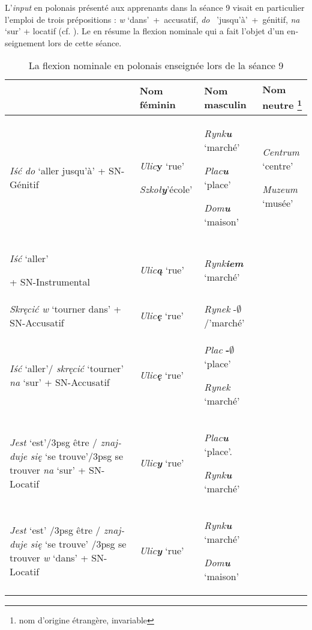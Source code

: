 \documentclass[output=paper]{langscibook}
\begin{document}
\begin{otherlanguage}{french}
L’\textit{input} en polonais présenté aux apprenants dans la séance 9 visait en particulier l’emploi de trois prépositions : \textit{w} `dans'~+~accusatif,  \textit{do} ~'jusqu’à'~+~génitif, \textit{na} `sur' + locatif (cf. ). Le  en  résume la flexion nominale qui a fait l’objet d’un enseignement lors de cette séance.


\begin{sidewaystable}
\caption{\label{tab:watorek:4}La flexion nominale en polonais enseignée lors de la séance 9}
\begin{tabularx}{\textwidth}{Ql>{\raggedright}p{}>{\raggedright\arraybackslash}p{}} 
\lsptoprule
& Nom féminin & Nom masculin & Nom neutre \footnote{nom d’origine étrangère, invariable}\\\midrule
\textit{Iść do} `aller jusqu’à' + SN-Génitif & \textit{Ulic}\textbf{y} `rue'

\textit{Szkoł\textbf{y}}'école' & \textit{Rynk\textbf{u}} `marché'

\textit{Plac\textbf{u}} `place'

\textit{Dom\textbf{u}} `maison' & \textit{Centrum} `centre'

\textit{Muzeum} `musée'\\
\textit{Iść} `aller'

+ SN-Instrumental & \textit{Ulic\textbf{ą}} `rue' & \textit{Rynk\textbf{iem}} `marché' & \\
\textit{Skręcić w} `tourner dans' + SN-Accusatif & \textit{Ulic\textbf{ę}} `rue' & \textit{Rynek} -${\emptyset}$/'marché' & \\
\textit{Iść} `aller'/ \textit{skręcić} `tourner' \textit{na} `sur' + SN-Accusatif & \textit{Ulic\textbf{ę}} `rue' & \textit{Plac} \textbf{{}-${\emptyset}$} `place'

\textit{Rynek} `marché' & \\
\textit{Jest} `est'/3psg être / \textit{znajduje się} `se trouve'/3psg se trouver \textit{na} `sur' + SN-Locatif & \textit{Ulic\textbf{y}} `rue' & \textit{Plac\textbf{u}} `place'.

\textit{Rynk\textbf{u}} `marché' & \\
\textit{Jest} `est' /3psg être / \textit{znajduje się} `se trouve' /3psg se trouver \textit{w} `dans' + SN-Locatif & \textit{Ulic\textbf{y}} `rue' & \textit{Rynk\textbf{u}} `marché'

\textit{Dom\textbf{u}} `maison'


\end{tabularx}
\end{sidewaystable}
\end{otherlanguage}
\end{document}
